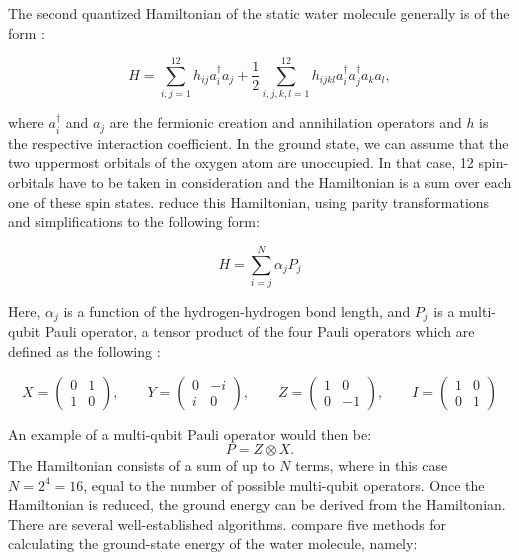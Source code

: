 The second quantized Hamiltonian of the static water molecule generally is of the form \cite{bian}:

$$
H=\sum_{i, j=1}^{12} h_{i j} a_{i}^{\dagger} a_{j}+\frac{1}{2} \sum_{i, j, k, l=1}^{12} h_{i j k l} a_{i}^{\dagger} a_{j}^{\dagger} a_{k} a_{l},
$$

where $ a_{i}^{\dagger}$ and $a_{j}$ are the fermionic creation and annihilation operators and $ h $ is the respective interaction coefficient. In the ground state, we can assume that the two uppermost orbitals of the oxygen atom are unoccupied. In that case, 12 spin-orbitals have to be taken in consideration and the Hamiltonian is a sum over each one of these spin states.
\textcite{bian} reduce this Hamiltonian, using parity transformations and simplifications to the following form:

$$
H=\sum_{i=j}^{N} \alpha_{j} P_{j}
$$

Here, $\alpha_{j}$ is a function of the hydrogen-hydrogen bond length, and $ P_{j}$ is a multi-qubit Pauli operator, a tensor product of the four Pauli operators which are defined as the following \cite{malley}:


$$
X=\left(\begin{array}{cc}
0 & 1 \\
1 & 0
\end{array}\right), \quad \quad Y=\left(\begin{array}{cc}
0 & -i \\
i & 0
\end{array}\right), \quad \quad Z=\left(\begin{array}{cc}
1 & 0 \\
0 & -1
\end{array}\right),\quad \quad I=\left(\begin{array}{cc}
1 & 0 \\
0 & 1
\end{array}\right)
$$




An example of a multi-qubit Pauli operator would then be: $$ P = Z \otimes X.$$
The Hamiltonian consists of a sum of up to $N$ terms, where in this case $N = 2^4 = 16$, equal to the number of possible multi-qubit operators. Once the Hamiltonian is reduced, the ground energy can be derived from the Hamiltonian. There are several well-established algorithms. \textcite{bian} compare five methods for calculating the ground-state energy of the water molecule, namely:


